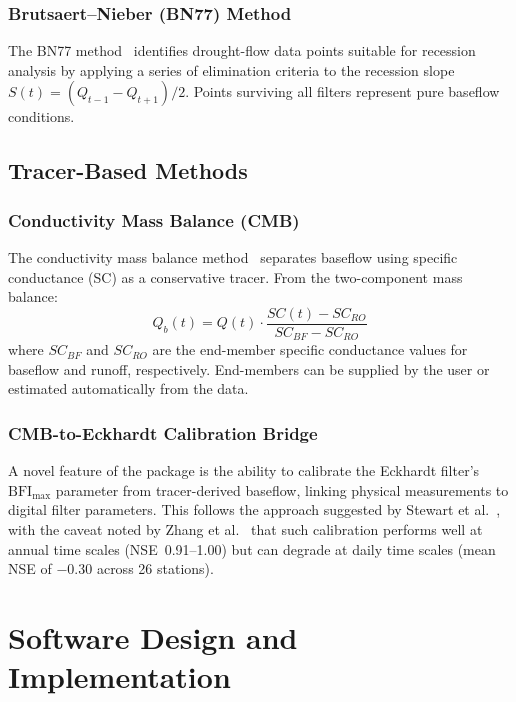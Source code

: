 \documentclass[hydrology,article,submit,pdftex,moreauthors]{Definitions/mdpi}
\begin{document}
\subsubsection{Brutsaert--Nieber (BN77) Method}

The BN77 method~\cite{Cheng2016} identifies drought-flow data points suitable for recession analysis by applying a series of elimination criteria to the recession slope $S(t) = (Q_{t-1} - Q_{t+1})/2$. Points surviving all filters represent pure baseflow conditions.

\subsection{Tracer-Based Methods}
\label{sec:tracer}

\subsubsection{Conductivity Mass Balance (CMB)}

The conductivity mass balance method~\cite{Stewart2007} separates baseflow using specific conductance (SC) as a conservative tracer. From the two-component mass balance:
\begin{equation}
\label{eq:cmb}
Q_b(t) = Q(t) \cdot \frac{SC(t) - SC_{RO}}{SC_{BF} - SC_{RO}}
\end{equation}
where $SC_{BF}$ and $SC_{RO}$ are the end-member specific conductance values for baseflow and runoff, respectively. End-members can be supplied by the user or estimated automatically from the data.

\subsubsection{CMB-to-Eckhardt Calibration Bridge}

A novel feature of the package is the ability to calibrate the Eckhardt filter's $\mathrm{BFI_{max}}$ parameter from tracer-derived baseflow, linking physical measurements to digital filter parameters. This follows the approach suggested by Stewart et al.~\cite{Stewart2007}, with the caveat noted by Zhang et al.~\cite{Zhang2021} that such calibration performs well at annual time scales (NSE~0.91--1.00) but can degrade at daily time scales (mean NSE of $-0.30$ across 26 stations).

\section{Software Design and Implementation}
\label{sec:design}
\end{document}

